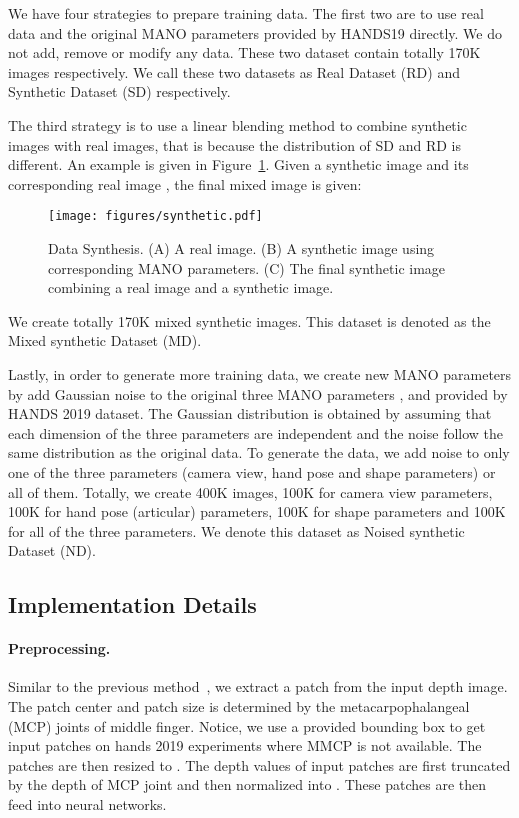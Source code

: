 \documentclass{article}
\begin{document}
We have four strategies to prepare training data. 
The first two are to use real data and the original MANO parameters provided by HANDS19 directly. We do not add, remove or modify any data. These two dataset contain totally 170K images respectively. We call these two datasets as Real Dataset (RD) and Synthetic Dataset
(SD) respectively. 

The third strategy is to use a linear blending method to combine synthetic images with real images, that is because the distribution of SD and RD is different. An example is given in Figure~\ref{fig:Synthetic}. 
Given a synthetic image  and its corresponding real image , the final mixed image is given:

\begin{figure}[t]
	\centering
	\texttt{[image: figures/synthetic.pdf]}
	\caption{Data Synthesis. (A) A real image. (B) A synthetic image using corresponding MANO parameters. (C) The final synthetic image combining a real image and a synthetic image.}
	\label{fig:Synthetic} 
\end{figure}
We create totally 170K mixed synthetic images. This dataset is denoted as the Mixed synthetic Dataset (MD).

Lastly, in order to generate more training data, we create new MANO parameters by add Gaussian noise to the original three MANO parameters ,  and  provided by HANDS 2019 dataset. The Gaussian distribution is obtained by assuming that each dimension of the three parameters are independent and the noise follow the same distribution as the original data. 
To generate the data, we add noise to only one of the three parameters (camera view, hand pose and shape parameters) or all of them. Totally, we create 400K images, 100K for camera view parameters, 100K for hand pose (articular) parameters, 100K for shape parameters and 100K for all of the three parameters. We denote this dataset as Noised
synthetic Dataset (ND).


\subsection{Implementation Details}\label{sec:detail}
\paragraph{Preprocessing.}
Similar to the previous method~\cite{chen2019pose}, we
extract a patch from the input depth image.
The patch center and patch size is determined by the metacarpophalangeal (MCP) joints of middle finger. Notice, we use a provided bounding box to get input patches on hands 2019 experiments where MMCP is not available. 
The patches are then resized to .
The depth values of input patches are first truncated by the depth of MCP joint and then normalized into .
These patches are then feed into neural networks.
\end{document}
